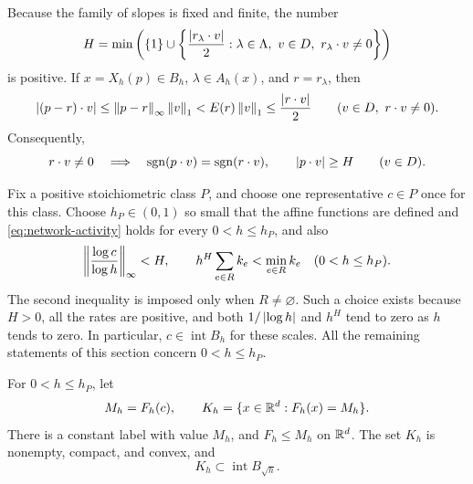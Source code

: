 Because the family of slopes is fixed and finite, the number
\begin{equation}\label{eq:uniform-sign-gap}
 H=\min\left(
 \{1\}\cup
 \left\{\frac{\left|r_\lambda\cdot v\right|}2:
       \lambda\in\Lambda,\ v\in D,\ r_\lambda\cdot v\ne0\right\}\right)
\end{equation}
is positive.  If $x=X_h(p)\in B_h$, $\lambda\in A_h(x)$, and
$r=r_\lambda$, then
\[
 \left|(p-r)\cdot v\right|
 \leq\left\|p-r\right\|_\infty\left\|v\right\|_1
 <E(r)\left\|v\right\|_1
 \leq\frac{\left|r\cdot v\right|}2
 \qquad (v\in D,\ r\cdot v\ne0).
\]
Consequently,
\begin{equation}\label{eq:sign-and-size}
 r\cdot v\ne0
 \quad\Longrightarrow\quad
 \operatorname{sgn}(p\cdot v)=\operatorname{sgn}(r\cdot v),
 \qquad \left|p\cdot v\right|\geq H
 \qquad (v\in D).
\end{equation}

Fix a positive stoichiometric class $P$, and choose one representative
$c\in P$ once for this class.  Choose $h_P\in(0,1)$ so small that the
affine functions are defined and \eqref{eq:network-activity} holds for
every $0<h\leq h_P$, and also
\begin{equation}\label{eq:class-scale}
 \left\|\frac{\log c}{\log h}\right\|_\infty<H,
 \qquad
 h^H\sum_{e\in R}k_e<\min_{e\in R}k_e
 \quad (0<h\leq h_P).
\end{equation}
The second inequality is imposed only when $R\ne\varnothing$.
Such a choice exists because $H>0$, all the rates are positive, and
both $1/\left|\log h\right|$ and $h^H$ tend to zero as $h$ tends to zero.
In particular, $c\in\operatorname{int}B_h$ for these scales.
All the remaining statements of this section concern $0<h\leq h_P$.

\begin{proposition}\label{prop:plateau}
For $0<h\leq h_P$, let
\[
 M_h=F_h(c),
 \qquad
 K_h=\{x\in\mathbb R^d:F_h(x)=M_h\}.
\]
There is a constant label with value $M_h$, and $F_h\leq M_h$ on
$\mathbb R^d$.  The set $K_h$ is nonempty, compact, and convex, and
\begin{equation}\label{eq:plateau-containment}
 K_h\subset\operatorname{int}B_{\sqrt h}.
\end{equation}
\end{proposition}

